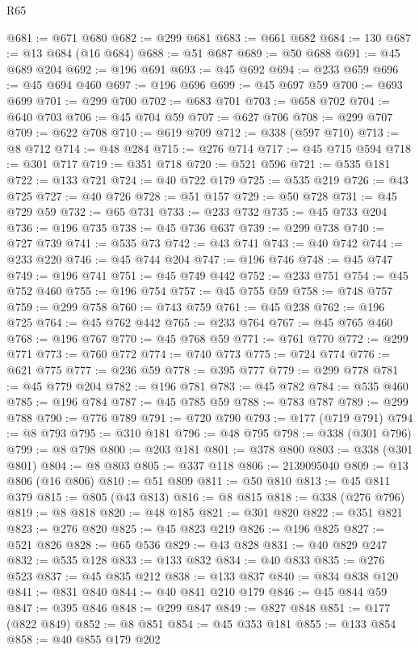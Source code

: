 \begin{lexlean}{R65}
\begin{coremodule}
@681 := @671 @680
@682 := @299 @681
@683 := @661 @682
@684 := 130
@687 := @13 @684 (@16 @684)
@688 := @51 @687
@689 := @50 @688
@691 := @45 @689 @204
@692 := @196 @691
@693 := @45 @692
@694 := @233 @659
@696 := @45 @694 @460
@697 := @196 @696
@699 := @45 @697 @59
@700 := @693 @699
@701 := @299 @700
@702 := @683 @701
@703 := @658 @702
@704 := @640 @703
@706 := @45 @704 @59
@707 := @627 @706
@708 := @299 @707
@709 := @622 @708
@710 := @619 @709
@712 := @338 (@597 @710)
@713 := @8 @712
@714 := @48 @284
@715 := @276 @714
@717 := @45 @715 @594
@718 := @301 @717
@719 := @351 @718
@720 := @521 @596
@721 := @535 @181
@722 := @133 @721
@724 := @40 @722 @179
@725 := @535 @219
@726 := @43 @725
@727 := @40 @726
@728 := @51 @157
@729 := @50 @728
@731 := @45 @729 @59
@732 := @65 @731
@733 := @233 @732
@735 := @45 @733 @204
@736 := @196 @735
@738 := @45 @736 @637
@739 := @299 @738
@740 := @727 @739
@741 := @535 @73
@742 := @43 @741
@743 := @40 @742
@744 := @233 @220
@746 := @45 @744 @204
@747 := @196 @746
@748 := @45 @747
@749 := @196 @741
@751 := @45 @749 @442
@752 := @233 @751
@754 := @45 @752 @460
@755 := @196 @754
@757 := @45 @755 @59
@758 := @748 @757
@759 := @299 @758
@760 := @743 @759
@761 := @45 @238
@762 := @196 @725
@764 := @45 @762 @442
@765 := @233 @764
@767 := @45 @765 @460
@768 := @196 @767
@770 := @45 @768 @59
@771 := @761 @770
@772 := @299 @771
@773 := @760 @772
@774 := @740 @773
@775 := @724 @774
@776 := @621 @775
@777 := @236 @59
@778 := @395 @777
@779 := @299 @778
@781 := @45 @779 @204
@782 := @196 @781
@783 := @45 @782
@784 := @535 @460
@785 := @196 @784
@787 := @45 @785 @59
@788 := @783 @787
@789 := @299 @788
@790 := @776 @789
@791 := @720 @790
@793 := @177 (@719 @791)
@794 := @8 @793
@795 := @310 @181
@796 := @48 @795
@798 := @338 (@301 @796)
@799 := @8 @798
@800 := @203 @181
@801 := @378 @800
@803 := @338 (@301 @801)
@804 := @8 @803
@805 := @337 @118
@806 := 2139095040
@809 := @13 @806 (@16 @806)
@810 := @51 @809
@811 := @50 @810
@813 := @45 @811 @379
@815 := @805 (@43 @813)
@816 := @8 @815
@818 := @338 (@276 @796)
@819 := @8 @818
@820 := @48 @185
@821 := @301 @820
@822 := @351 @821
@823 := @276 @820
@825 := @45 @823 @219
@826 := @196 @825
@827 := @521 @826
@828 := @65 @536
@829 := @43 @828
@831 := @40 @829 @247
@832 := @535 @128
@833 := @133 @832
@834 := @40 @833
@835 := @276 @523
@837 := @45 @835 @212
@838 := @133 @837
@840 := @834 @838 @120
@841 := @831 @840
@844 := @40 @841 @210 @179
@846 := @45 @844 @59
@847 := @395 @846
@848 := @299 @847
@849 := @827 @848
@851 := @177 (@822 @849)
@852 := @8 @851
@854 := @45 @353 @181
@855 := @133 @854
@858 := @40 @855 @179 @202

\end{coremodule}
\end{lexlean}
